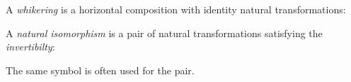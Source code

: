 \begin{definition}[Whiskering]
A \emph{whikering} is a horizontal composition with identity natural transformations:
\end{definition}


\begin{definition}
A \emph{natural isomorphism} is a pair of natural transformations
satisfying the \emph{invertibilty}:
\end{definition}
The same symbol is often used for the pair. %

